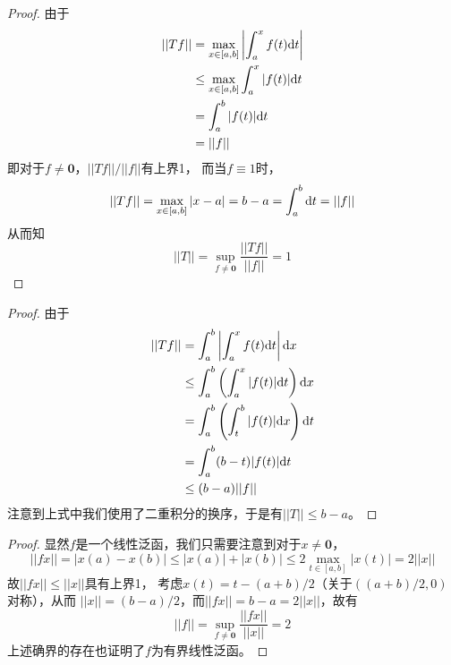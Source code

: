 \documentclass[cn]{homework}
\begin{document}
    \problem
    \begin{subproblem}[(\arabic*)]
        \item
        \begin{proof}
        由于
        \[\begin{aligned}
            ||Tf||&=\max_{x\in[a,b]}\left|\int_a^xf(t)\mathrm d t\right|\\
            &\leq\max_{x\in[a,b]}\int_a^x|f(t)|\mathrm d t\\
            &=\int_a^b|f(t)|\mathrm d t\\
            &=||f||
        \end{aligned}\]
        即对于$f\neq\boldsymbol 0$，$||Tf||/||f||$有上界1，
        而当$f\equiv 1$时，
        \[||Tf||=\max_{x\in[a,b]}|x-a|=b-a=\int_a^b\mathrm d t=||f||\]
        从而知
        \[||T||=\sup_{f\neq\boldsymbol 0}\frac{||Tf||}{||f||}=1\]
        \end{proof}

        \item
        \begin{proof}
        由于
        \[\begin{aligned}
            ||Tf||&=\int_a^b\left|\int_a^xf(t)\mathrm d t\right|\mathrm d x\\
            &\leq\int_a^b\left(\int_a^x|f(t)|\mathrm d t\right)\mathrm d x\\
            &=\int_a^b\left(\int_t^b|f(t)|\mathrm d x\right)\mathrm d t\\
            &=\int_a^b(b-t)|f(t)|\mathrm d t\\
            &\leq(b-a)||f||
        \end{aligned}\]
        注意到上式中我们使用了二重积分的换序，于是有$||T||\leq b-a$。
        \end{proof}

    \end{subproblem}

    \problem
    \begin{proof}
        显然$f$是一个线性泛函，我们只需要注意到对于$x\neq\boldsymbol 0$，
        \[||fx||=|x(a)-x(b)|
        \leq|x(a)|+|x(b)|
        \leq 2\max_{t\in[a,b]}|x(t)|
        =2||x||\]
        故$||fx||\leq ||x||$具有上界1，
        考虑$x(t)=t-(a+b)/2$（关于$((a+b)/2,0)$对称），从而
        $||x||=(b-a)/2$，而$||fx||=b-a=2||x||$，故有
        \[||f||=\sup_{f\neq\boldsymbol 0}\frac{||fx||}{||x||}
        =2\]
        上述确界的存在也证明了$f$为有界线性泛函。
    \end{proof}

    
\end{document}
